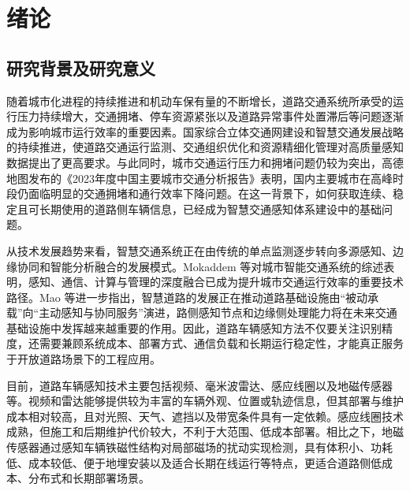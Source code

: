 \documentclass{xdupgthesis}
\begin{document}













\chapter{绪论}

\section{研究背景及研究意义}
\label{sec:intro_background}

随着城市化进程的持续推进和机动车保有量的不断增长，道路交通系统所承受的运行压力持续增大，交通拥堵、停车资源紧张以及道路异常事件处置滞后等问题逐渐成为影响城市运行效率的重要因素。国家综合立体交通网建设和智慧交通发展战略的持续推进，使道路交通运行监测、交通组织优化和资源精细化管理对高质量感知数据提出了更高要求\cite{R01}。与此同时，城市交通运行压力和拥堵问题仍较为突出，高德地图发布的《2023年度中国主要城市交通分析报告》表明，国内主要城市在高峰时段仍面临明显的交通拥堵和通行效率下降问题\cite{R02}。在这一背景下，如何获取连续、稳定且可长期使用的道路侧车辆信息，已经成为智慧交通感知体系建设中的基础问题。

从技术发展趋势来看，智慧交通系统正在由传统的单点监测逐步转向多源感知、边缘协同和智能分析融合的发展模式。Mokaddem 等对城市智能交通系统的综述表明，感知、通信、计算与管理的深度融合已成为提升城市交通运行效率的重要技术路径\cite{R03}。Mao 等进一步指出，智慧道路的发展正在推动道路基础设施由“被动承载”向“主动感知与协同服务”演进，路侧感知节点和边缘侧处理能力将在未来交通基础设施中发挥越来越重要的作用\cite{R05}。因此，道路车辆感知方法不仅要关注识别精度，还需要兼顾系统成本、部署方式、通信负载和长期运行稳定性，才能真正服务于开放道路场景下的工程应用。

目前，道路车辆感知技术主要包括视频、毫米波雷达、感应线圈以及地磁传感器等。视频和雷达能够提供较为丰富的车辆外观、位置或轨迹信息，但其部署与维护成本相对较高，且对光照、天气、遮挡以及带宽条件具有一定依赖。感应线圈技术成熟，但施工和后期维护代价较大，不利于大范围、低成本部署。相比之下，地磁传感器通过感知车辆铁磁性结构对局部磁场的扰动实现检测，具有体积小、功耗低、成本较低、便于地埋安装以及适合长期在线运行等特点，更适合道路侧低成本、分布式和长期部署场景。
\end{document}
